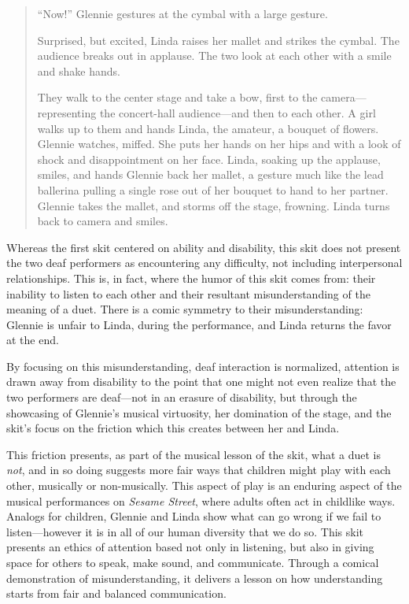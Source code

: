\documentclass[12pt,letterpaper]{article}
\begin{document}
\begin{quote}
	``Now!'' Glennie gestures at the cymbal with a large gesture. 

	Surprised, but excited, Linda raises her mallet and strikes the cymbal. 
	The audience breaks out in applause. The two look at each other with a 
	smile and shake hands. 

	They walk to the center stage and take a bow, first to the camera---
	representing the concert-hall audience---and then to each other. A girl 
	walks up to them and hands Linda, the amateur, a bouquet of flowers. 
	Glennie watches, miffed. She puts her hands on her hips and with a look 
	of shock and disappointment on her face. Linda, soaking up the applause, 
	smiles, and hands Glennie back her mallet, a gesture much like the lead 
	ballerina pulling a single rose out of her bouquet to hand to her 
	partner. Glennie takes the mallet, and storms off the stage, frowning. 
	Linda turns back to camera and smiles.   

	\end{quote}

	Whereas the first skit centered on ability and disability, this skit 
	does not present the two deaf performers as encountering any difficulty,
	not including interpersonal relationships. This is, in fact, where the
	humor of this skit comes from: their inability to listen to each other
	and their resultant misunderstanding of the meaning of a duet. There is
	a comic symmetry to their misunderstanding: Glennie is unfair to Linda, 
	during the performance, and Linda returns the favor at the end. 

	By focusing on this misunderstanding, deaf interaction is normalized,
	attention is drawn away from disability to the point that one might not
	even realize that the two performers are deaf---not in an erasure of 
	disability, but through the showcasing of Glennie's musical virtuosity,
	her domination of the stage, and the skit's focus on the friction
	which this creates between her and Linda.  

	This friction presents, as part of the musical lesson of the skit, 
	what a duet is \textit{not}, and in so doing suggests more fair ways
	that children might play with each other, musically or non-musically.
	This aspect of play is an enduring aspect of the musical performances
	on \textit{Sesame Street}, where adults often act in childlike ways.
	Analogs for children, Glennie and Linda show what can go wrong if we
	fail to listen---however it is in all of our human diversity that we
	do so. This skit presents an ethics of attention based not only in
	listening, but also in giving space for others to speak, make sound,
	and communicate. Through a comical demonstration of misunderstanding, 
	it delivers a lesson on how understanding starts from fair and balanced
	communication.	
\end{document}
